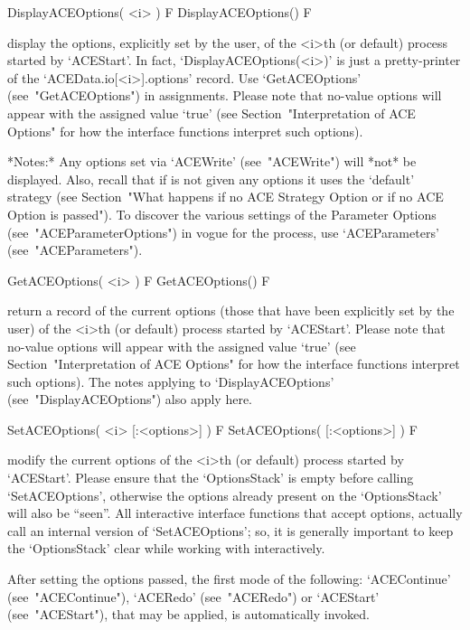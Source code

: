 \>DisplayACEOptions( <i> ) F
\>DisplayACEOptions() F

display the options, explicitly set by the user, of the  <i>th  (or  default)  process  started  by
`ACEStart'. In fact, `DisplayACEOptions(<i>)' is just a pretty-printer
of   the   `ACEData.io[<i>].options'   record.   Use   `GetACEOptions'
(see~"GetACEOptions") in assignments. Please note that no-value {\ACE}
options  will   appear   with   the   assigned   value   `true'   (see
Section~"Interpretation of ACE Options" for how the  {\ACE}  interface
functions interpret such options). 

*Notes:* 
Any  options  set  via  `ACEWrite'  (see~"ACEWrite")  will  *not*   be
displayed. Also, recall that if {\ACE} is not  given  any  options  it
uses the `default' strategy  (see  Section~"What  happens  if  no  ACE
Strategy Option or if no ACE  Option  is  passed").  To  discover  the
various    settings    of     the     {\ACE}     Parameter     Options
(see~"ACEParameterOptions") in  vogue  for  the  {\ACE}  process,  use
`ACEParameters' (see~"ACEParameters").

\>GetACEOptions( <i> ) F
\>GetACEOptions() F

return  a  record  of  the  current  options  (those  that  have  been
explicitly set by the user) of the <i>th (or default) process  started
by `ACEStart'. Please note that no-value {\ACE}  options  will  appear
with the assigned value `true'  (see  Section~"Interpretation  of  ACE
Options"  for  how  the  {\ACE}  interface  functions  interpret  such
options).    The     notes     applying     to     `DisplayACEOptions'
(see~"DisplayACEOptions") also apply here.

\>SetACEOptions( <i> [:<options>] ) F
\>SetACEOptions( [:<options>] ) F

modify the current options of the <i>th (or default)  process  started
by `ACEStart'. Please ensure that the `OptionsStack' is  empty  before
calling `SetACEOptions', otherwise the options already present on  the
`OptionsStack' will also be ``seen''. All interactive {\ACE} interface
functions that accept options, actually call an  internal  version  of
`SetACEOptions';  so,  it  is  generally   important   to   keep   the
`OptionsStack' clear while working with {\ACE} interactively.

After setting the options passed, the first  mode  of  the  following:
`ACEContinue'  (see~"ACEContinue"),   `ACERedo'   (see~"ACERedo")   or
`ACEStart' (see~"ACEStart"), that may  be  applied,  is  automatically
invoked.

